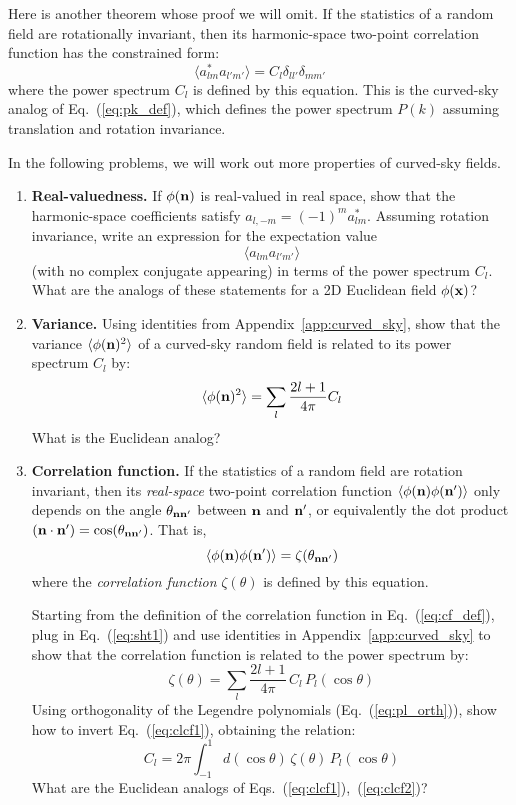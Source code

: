 \documentclass[aps,prd,superscriptaddress,groupedaddress,nofootinbib,nobibnotes]{revtex4}
\newcommand{\be}{\begin{equation}}
\newcommand{\ee}{\end{equation}}
\def\x{{\bf x}}
\def\n{{\bf n}}
\begin{document}
Here is another theorem whose proof we will omit.
If the statistics of a random field are rotationally invariant, then its harmonic-space two-point
correlation function has the constrained form:
\be
\langle a_{l m}^* a_{l'm'} \rangle = C_l \delta_{ll'} \delta_{mm'}   \label{eq:cl_def}
\ee
where the power spectrum $C_l$ is defined by this equation.  This is the curved-sky analog of
Eq.~(\ref{eq:pk_def}), which defines the power spectrum $P(k)$ assuming translation and rotation
invariance.

In the following problems, we will work out more properties of curved-sky fields.

\begin{enumerate}

\item {\bf Real-valuedness.} If $\phi(\n)$ is real-valued in real space, show that the harmonic-space 
 coefficients satisfy $a_{l,-m} = (-1)^m a_{lm}^*$.  Assuming rotation invariance, write an expression 
 for the expectation value
\be
\langle a_{lm} a_{l'm'} \rangle
\ee
 (with no complex conjugate appearing) in terms of the power spectrum $C_l$.  
 What are the analogs of these statements for a 2D Euclidean field $\phi(\x)$?

\item {\bf Variance.} Using identities from Appendix~\ref{app:curved_sky}, show that the variance 
 $\langle \phi(\n)^2 \rangle$ of a curved-sky random field is related to its power spectrum $C_l$ by:
\be
\langle \phi(\n)^2 \rangle = \sum_l \frac{2l+1}{4\pi} C_l
\ee
 What is the Euclidean analog?

\item {\bf Correlation function.} If the statistics of a random field are rotation invariant, then its {\em real-space}
 two-point correlation function $\langle \phi(\n) \phi(\n') \rangle$ only depends on the angle
 $\theta_{\n\n'}$ between $\n$ and $\n'$, or equivalently the dot product $(\n\cdot\n') = \cos(\theta_{\n\n'})$.  
 That is,
\be
 \langle \phi(\n) \phi(\n') \rangle = \zeta(\theta_{\n\n'})  \label{eq:cf_def}
\ee
 where the {\em correlation function} $\zeta(\theta)$ is defined by this equation.

 Starting from the definition of the correlation function in Eq.~(\ref{eq:cf_def}),
 plug in Eq.~(\ref{eq:sht1}) and use identities in Appendix~\ref{app:curved_sky}
 to show that the correlation function is related to the power spectrum by:
\be
 \zeta(\theta) = \sum_l \frac{2l+1}{4\pi} \, C_l \, P_l(\cos\theta)  \label{eq:clcf1}
\ee
 Using orthogonality of the Legendre polynomials (Eq.~(\ref{eq:pl_orth})), show how
 to invert Eq.~(\ref{eq:clcf1}), obtaining the relation:
\be
C_l = 2\pi \int_{-1}^1 d(\cos\theta) \, \zeta(\theta) \, P_l(\cos\theta)  \label{eq:clcf2}
\ee
 What are the Euclidean analogs of Eqs.~(\ref{eq:clcf1}),~(\ref{eq:clcf2})?


\end{enumerate}
\end{document}
